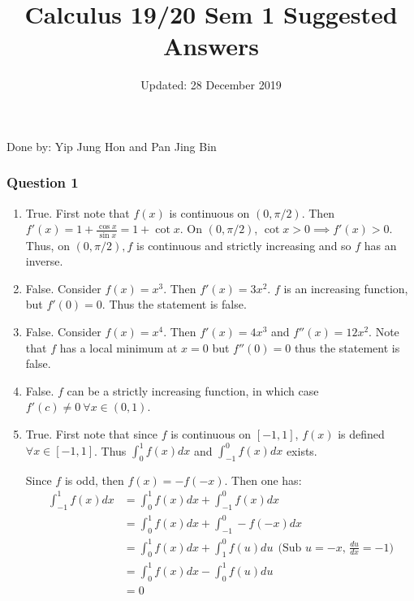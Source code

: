 \documentclass{article}
\title{Calculus 19/20 Sem 1 Suggested Answers}
\author{\makebox[.9\textwidth]{NUS LaTeXify Proj Team}}
\date{Updated: 28 December 2019}
\begin{document}
\maketitle

Done by: Yip Jung Hon and Pan Jing Bin
\hline

\subsubsection*{Question 1}
\begin{enumerate}[label=\alph*)]
    \item True. First note that $f(x)$ is continuous on $(0,\pi/2)$. Then $f'(x) = 1 + \frac{\cos x}{\sin x}=1+\cot x$. On $(0,\pi/2)$, $\cot x > 0 \implies f'(x) > 0$. Thus, on $(0,\pi/2), f$ is continuous and strictly increasing and so $f$ has an inverse.
    \item False. Consider $f(x) = x^3$. Then $f'(x) = 3x^2.$ $f$ is an increasing function, but $f'(0) = 0$. Thus the statement is false.
    \item False.  Consider $f(x) = x^4$. Then $f'(x) = 4x^3$ and $f''(x) = 12x^2$. Note that $f$ has a local minimum at $x = 0$ but $f''(0) = 0$ thus the statement is false.
    \item False. $f$ can be a strictly increasing function, in which case $f'(c) \neq 0 \  \forall x\in (0,1)$.
    \item True. First note that since $f$ is continuous on $[-1,1]$, $f(x)$ is defined $\forall x\in [-1,1]$. Thus $\int^1_{0} f(x) dx$ and $\int^0_{-1} f(x) dx$ exists.
    
    Since $f$ is odd, then $f(x) = -f(-x)$. Then one has:
    \begin{align*}
        \int^1_{-1} f(x) dx&=\int^1_{0} f(x) dx +\int^0_{-1} f(x) dx \\
        &= \int^1_{0} f(x) dx +\int^0_{-1}-f(-x)dx \\
        &= \int^1_{0} f(x) dx +\int^0_{1}f(u)du \ \ \text{(Sub $u = -x$, $\frac{du}{dx}=-1$)} \\
        &= \int^1_{0} f(x) dx -\int^1_{0}f(u)du\\
        &= 0
    \end{align*}
\end{enumerate}

\pagebreak
\end{document}
